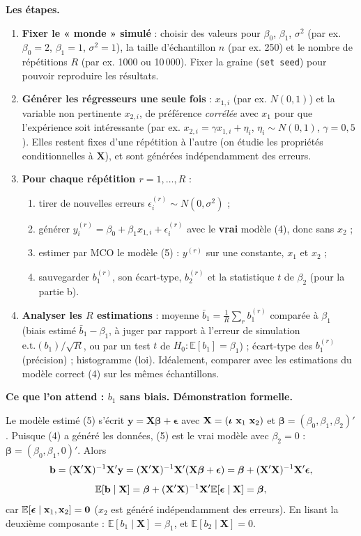 \documentclass[11pt,a4paper]{article}
\newcommand{\vy}{\mathbf{y}}\newcommand{\vX}{\mathbf{X}}\newcommand{\vZ}{\mathbf{Z}}
\newcommand{\vbeta}{\bm{\beta}}\newcommand{\veps}{\bm{\epsilon}}\newcommand{\vi}{\bm{\iota}}
\newcommand{\E}{\mathbb{E}}\newcommand{\Var}{\operatorname{Var}}\newcommand{\Cov}{\operatorname{Cov}}
\begin{document}
\textbf{Les étapes.}
\begin{enumerate}
\item \textbf{Fixer le « monde » simulé} : choisir des valeurs pour $\beta_0$, $\beta_1$, $\sigma^2$ (par ex. $\beta_0=2$, $\beta_1=1$, $\sigma^2=1$), la taille d'échantillon $n$ (par ex. 250) et le nombre de répétitions $R$ (par ex. 1000 ou 10\,000). Fixer la graine (\texttt{set seed}) pour pouvoir reproduire les résultats.
\item \textbf{Générer les régresseurs une seule fois} : $x_{1,i}$ (par ex. $N(0,1)$) et la variable non pertinente $x_{2,i}$, de préférence \emph{corrélée} avec $x_1$ pour que l'expérience soit intéressante (par ex. $x_{2,i}=\gamma x_{1,i}+\eta_i$, $\eta_i\sim N(0,1)$, $\gamma=0{,}5$). Elles restent fixes d'une répétition à l'autre (on étudie les propriétés conditionnelles à $\vX$), et sont générées indépendamment des erreurs.
\item \textbf{Pour chaque répétition $r=1,\dots,R$} :
\begin{enumerate}[nosep]
\item tirer de nouvelles erreurs $\epsilon_i^{(r)}\sim N(0,\sigma^2)$ ;
\item générer $y_i^{(r)}=\beta_0+\beta_1x_{1,i}+\epsilon_i^{(r)}$ avec le \textbf{vrai} modèle (4), donc sans $x_2$ ;
\item estimer par MCO le modèle (5) : $y^{(r)}$ sur une constante, $x_1$ et $x_2$ ;
\item sauvegarder $b_1^{(r)}$, son écart-type, $b_2^{(r)}$ et la statistique $t$ de $\beta_2$ (pour la partie b).
\end{enumerate}
\item \textbf{Analyser les $R$ estimations} : moyenne $\bar b_1=\frac1R\sum_rb_1^{(r)}$ comparée à $\beta_1$ (biais estimé $\bar b_1-\beta_1$, à juger par rapport à l'erreur de simulation $\text{e.t.}(b_1)/\sqrt R$, ou par un test $t$ de $H_0:\E[b_1]=\beta_1$) ; écart-type des $b_1^{(r)}$ (précision) ; histogramme (loi). Idéalement, comparer avec les estimations du modèle correct (4) sur les mêmes échantillons.
\end{enumerate}

\textbf{Ce que l'on attend : $b_1$ sans biais. Démonstration formelle.}

Le modèle estimé (5) s'écrit $\vy=\vX\vbeta+\veps$ avec $\vX=(\vi\ \vx_1\ \vx_2)$ et $\vbeta=(\beta_0,\beta_1,\beta_2)'$. Puisque (4) a généré les données, (5) est le vrai modèle avec $\beta_2=0$ : $\vbeta=(\beta_0,\beta_1,0)'$. Alors
\[
\vb=(\vX'\vX)^{-1}\vX'\vy=(\vX'\vX)^{-1}\vX'(\vX\vbeta+\veps)=\vbeta+(\vX'\vX)^{-1}\vX'\veps,
\]
\[
\E[\vb\mid\vX]=\vbeta+(\vX'\vX)^{-1}\vX'\E[\veps\mid\vX]=\vbeta ,
\]
car $\E[\veps\mid\vx_1,\vx_2]=\mathbf 0$ ($x_2$ est généré indépendamment des erreurs). En lisant la deuxième composante : $\E[b_1\mid\vX]=\beta_1$, et $\E[b_2\mid\vX]=0$.
\end{document}
